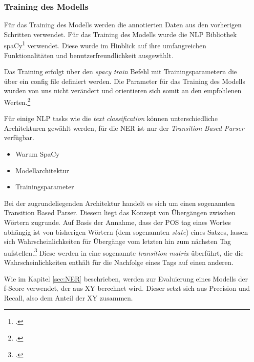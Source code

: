 \subsubsection{Training des Modells}\label{sec:ModelTraining}
Für das Training des Modells werden die annotierten Daten aus den vorherigen Schritten verwendet.
Für das Training des Modells wurde die \acl{NLP} Bibliothek spaCy\footcite[]{spacy2} verwendet. Diese wurde im Hinblick auf ihre umfangreichen Funktionalitäten und benutzerfreundlichkeit ausgewählt.

Das Training erfolgt über den \textit{spacy train} Befehl mit Trainingsparametern die über ein config file definiert werden. Die Parameter für das Training des Modells wurden von uns nicht verändert und orientieren sich somit an den empfohlenen Werten.\footcite[vgl.]{ostkamp2021}%

Für einige \ac{NLP} tasks wie die \textit{text classification} können unterschiedliche Architekturen gewählt werden, für die \acl{NER} ist nur der \textit{Transition Based Parser} verfügbar.%

\begin{itemize}
    \item Warum SpaCy
    \item Modellarchitektur
    \item Trainingsparameter
\end{itemize}

Bei der zugrundeliegenden Architektur handelt es sich um einen sogenannten Transition Based Parser. Diesem liegt das Konzept von Übergängen zwischen Wörtern zugrunde. Auf Basis der Annahme, dass der \acl{POS} tag eines Wortes abhängig ist von bisherigen Wörtern (dem sogenannten \textit{state}) eines Satzes, lassen sich Wahrscheinlichkeiten für Übergänge vom letzten hin zum nächsten Tag aufstellen.\footcite{honnibal2013a} Diese werden in eine sogenannte \textit{transition matrix} überführt, die die Wahrscheinlichkeiten enthält für die Nachfolge eines Tags auf einen anderen.

Wie im Kapitel \ref{sec:NER} beschrieben, werden zur Evaluierung eines Modells der f-Score verwendet, der aus XY berechnet wird. Dieser setzt sich aus Precision und Recall, also dem Anteil der XY zusammen.

